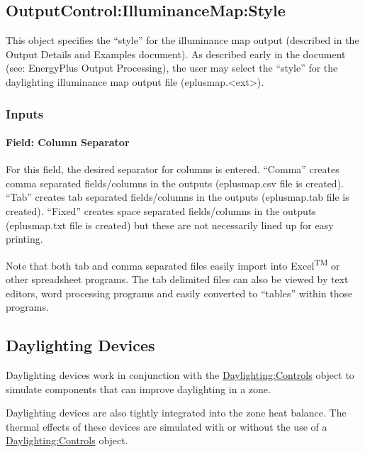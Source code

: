 \subsection{OutputControl:IlluminanceMap:Style}\label{outputcontrolilluminancemapstyle}

This object specifies the ``style'' for the illuminance map output (described in the Output Details and Examples document). As described early in the document (see: EnergyPlus Output Processing), the user may select the ``style'' for the daylighting illuminance map output file (eplusmap.\textless{}ext\textgreater{}).

\subsubsection{Inputs}\label{inputs-5-006}

\paragraph{Field: Column Separator}\label{field-column-separator}

For this field, the desired separator for columns is entered. ``Comma'' creates comma separated fields/columns in the outputs (eplusmap.csv file is created). ``Tab'' creates tab separated fields/columns in the outputs (eplusmap.tab file is created). ``Fixed'' creates space separated fields/columns in the outputs (eplusmap.txt file is created) but these are not necessarily lined up for easy printing.

Note that both tab and comma separated files easily import into Excel\textsuperscript{TM} or other spreadsheet programs. The tab delimited files can also be viewed by text editors, word processing programs and easily converted to ``tables'' within those programs.

\subsection{Daylighting Devices}\label{daylighting-devices}

Daylighting devices work in conjunction with the \hyperref[daylightingcontrols-000]{Daylighting:Controls} object to simulate components that can improve daylighting in a zone.

Daylighting devices are also tightly integrated into the zone heat balance. The thermal effects of these devices are simulated with or without the use of a \hyperref[daylightingcontrols-000]{Daylighting:Controls} object.

